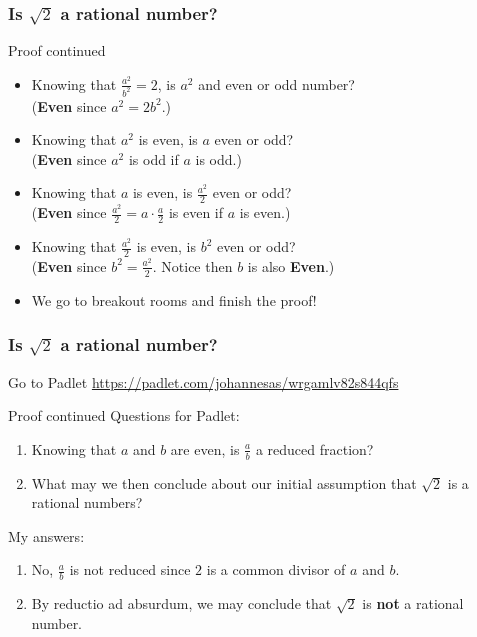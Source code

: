 \documentclass{beamer}[10]
\begin{document}
\begin{frame}
	\frametitle{Is $ \sqrt{2} $ a rational number?}
	\begin{block}{Proof continued}
		\begin{itemize}
			\item Knowing that $ \frac{a^2}{b^2}=2 $, is $ a^2 $ and even or odd number?\pause\pause \\(\textbf{Even} since $ a^2=2b^2 $.)\pause\\
			\item Knowing that $ a^2 $ is even, is $ a $ even or odd?\pause\pause \\
			(\textbf{Even} since $ a^2 $ is odd if $ a $ is odd.)\pause
			\item Knowing that $ a $ is even, is $ \frac{a^2}{2} $ even or odd?\pause\pause \\
			(\textbf{Even} since $ \frac{a^2}{2}=a\cdot\frac{a}{2} $ is even if $ a $ is even.)\pause
			\item Knowing that $ \frac{a^2}{2} $ is even, is $ b^2 $ even or odd?\pause\pause \\
			(\textbf{Even} since $ b^2=\frac{a^2}{2} $. Notice then $ b $ is also \textbf{Even}.)\pause\\
			\item We go to breakout rooms and finish the proof!
		\end{itemize}
	\end{block}
\end{frame}
\begin{frame}
	\frametitle{Is $ \sqrt{2} $ a rational number?}
	Go to Padlet \url{https://padlet.com/johannesas/wrgamlv82s844qfs}
	\begin{block}{Proof continued}
		Questions for Padlet:
		\begin{enumerate}
		\item Knowing that $ a $ and $ b $ are even, is $\frac{a}{b}$ a reduced fraction?
		\item What may we then conclude about our initial assumption that $ \sqrt{2} $ is a rational numbers?
	\end{enumerate}\pause\pause\pause
	My answers:
	\begin{enumerate}
		\item No, $ \frac{a}{b} $ is not reduced since $ 2 $ is a common divisor of $ a $ and $ b $.
		\item By reductio ad absurdum, we may conclude that $ \sqrt{2} $ is \textbf{not} a rational number.
	\end{enumerate}
	\end{block}
\end{frame}
\end{document}
